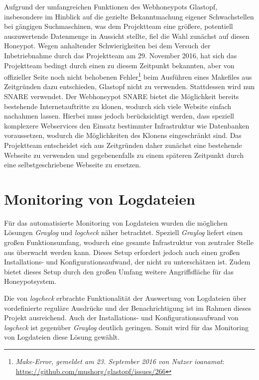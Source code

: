 Aufgrund der umfangreichen Funktionen des Webhoneypots Glastopf, insbesondere im Hinblick auf die gezielte Bekanntmachung eigener Schwachstellen bei gängigen Suchmaschinen, was dem Projektteam eine größere, potentiell auszuwertende Datenmenge in Aussicht stellte, fiel die Wahl zunächst auf diesen Honeypot. Wegen anhaltender Schwierigkeiten bei dem Versuch der Inbetriebnahme durch das Projektteam am 29. November 2016, hat sich das Projektteam bedingt durch einen zu diesem Zeitpunkt bekannten, aber von offizieller Seite noch nicht behobenen Fehler\footnote{ \textit{Make-Error, gemeldet am 23. September 2016 von Nutzer ioanamat}: \url{https://github.com/mushorg/glastopf/issues/266}} beim Ausführen eines Makefiles aus Zeitgründen dazu entschieden, Glastopf nicht zu verwenden. Stattdessen wird nun SNARE verwendet. Der Webhoneypot SNARE bietet die Möglichkeit bereits bestehende Internetauftritte zu klonen, wodurch sich viele Website einfach nachahmen lassen. Hierbei muss jedoch berücksichtigt werden, dass speziell komplexere Webservices den Einsatz bestimmter Infrastruktur wie Datenbanken voraussetzen, wodurch die Möglichkeiten des Klonens eingeschränkt sind. Das Projektteam entscheidet sich aus Zeitgründen daher zunächst eine bestehende Webseite zu verwenden und gegebenenfalls zu einem späteren Zeitpunkt durch eine selbstgeschriebene Webseite zu ersetzen.


\section{Monitoring von Logdateien}
\label{sec:Monitoring von Logdateien}

Für das automatisierte Monitoring von Logdateien wurden die möglichen Lösungen \textit{Graylog} und \textit{logcheck} näher betrachtet. Speziell \textit{Graylog} liefert einen großen Funktionsumfang, wodurch eine gesamte Infrastruktur von zentraler Stelle aus überwacht werden kann. Dieses Setup erfordert jedoch auch einen großen Installations- und Konfigurationsaufwand, der nicht zu unterschätzen ist. Zudem bietet dieses Setup durch den großen Umfang weitere Angriffsfläche für das Honeypotsystem.

Die von \textit{logcheck} erbrachte Funktionalität der Auswertung von Logdateien über vordefinierte reguläre Ausdrücke und der Benachrichtigung ist im Rahmen dieses Projekt ausreichend. Auch der Installations- und Konfigurationsaufwand von \textit{logcheck} ist gegenüber \textit{Graylog} deutlich geringen. Somit wird für das Monitoring von Logdateien diese Lösung gewählt.


